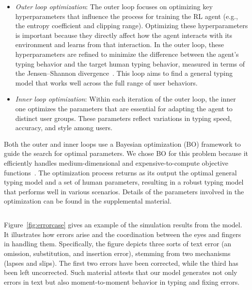 \begin{itemize}
    \item \textit{Outer loop optimization}: The outer loop focuses on optimizing key hyperparameters that influence the process for training the RL agent (e.g., the entropy coefficient and clipping range). Optimizing these hyperparameters is important because they directly affect how the agent interacts with its environment and learns from that interaction. In the outer loop, these hyperparameters are refined to minimize the difference between the agent's typing behavior and the target human typing behavior, measured in terms of the Jensen--Shannon divergence~\cite{shi2024crtypist}. This loop aims to find a general typing model that works well across the full range of user behaviors.
    \item \textit{Inner loop optimization}:  Within each iteration of the outer loop, the inner one optimizes the parameters that are essential for adapting the agent to distinct user groups. These parameters reflect variations in typing speed, accuracy, and style among users.
\end{itemize}

Both the outer and inner loops use a Bayesian optimization (BO) framework to guide the search for optimal parameters. We chose BO for this problem because it efficiently handles medium-dimensional and expensive-to-compute objective functions~\cite{gel_bayesian_2018}. The optimization process returns as its output the optimal general typing model and a set of human parameters, resulting in a robust typing model that performs well in various scenarios. Details of the parameters involved in the optimization can be found in the supplemental material.

\subsection{}


Figure~\ref{fig:errorcase} gives an example of the simulation results from the model. It illustrates how errors arise and the coordination between the eyes and fingers in handling them.
Specifically, the figure depicts three sorts of text error (an omission, substitution, and insertion error), stemming from two mechanisms (lapses and slips). The first two errors have been corrected, while the third has been left uncorrected.
Such material attests that our model generates not only errors in text but also  moment-to-moment behavior in typing and fixing errors.

